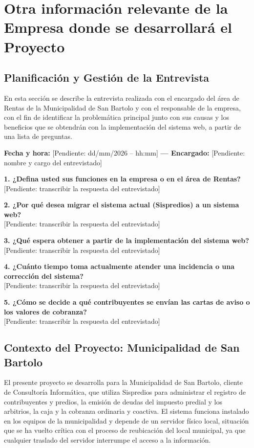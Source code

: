 \documentclass[12pt,a4paper]{report}
\newcommand{\pend}[1]{\textcolor{pendcol}{[Pendiente: #1]}}
\begin{document}
\section{Otra información relevante de la Empresa donde se desarrollará el Proyecto}

\subsection{Planificación y Gestión de la Entrevista}
En esta sección se describe la entrevista realizada con el encargado del área de Rentas de la Municipalidad de San Bartolo y con el responsable de la empresa, con el fin de identificar la problemática principal junto con sus causas y los beneficios que se obtendrán con la implementación del sistema web, a partir de una lista de preguntas.

\noindent\textbf{Fecha y hora:} \pend{dd/mm/2026 -- hh:mm} \textbf{--- Encargado:} \pend{nombre y cargo del entrevistado}

\noindent\textbf{1. ¿Defina usted sus funciones en la empresa o en el área de Rentas?}\\
\pend{transcribir la respuesta del entrevistado}

\noindent\textbf{2. ¿Por qué desea migrar el sistema actual (Sispredios) a un sistema web?}\\
\pend{transcribir la respuesta del entrevistado}

\noindent\textbf{3. ¿Qué espera obtener a partir de la implementación del sistema web?}\\
\pend{transcribir la respuesta del entrevistado}

\noindent\textbf{4. ¿Cuánto tiempo toma actualmente atender una incidencia o una corrección del sistema?}\\
\pend{transcribir la respuesta del entrevistado}

\noindent\textbf{5. ¿Cómo se decide a qué contribuyentes se envían las cartas de aviso o los valores de cobranza?}\\
\pend{transcribir la respuesta del entrevistado}

\subsection{Contexto del Proyecto: Municipalidad de San Bartolo}
El presente proyecto se desarrolla para la Municipalidad de San Bartolo, cliente de Consultoría Informática, que utiliza Sispredios para administrar el registro de contribuyentes y predios, la emisión de deudas del impuesto predial y los arbitrios, la caja y la cobranza ordinaria y coactiva. El sistema funciona instalado en los equipos de la municipalidad y depende de un servidor físico local, situación que se ha vuelto crítica con el proceso de reubicación del local municipal, ya que cualquier traslado del servidor interrumpe el acceso a la información.
\end{document}

